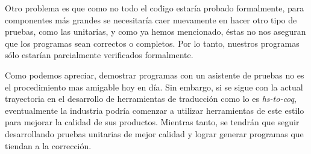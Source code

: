 Otro problema es que como no todo el co\'digo estaría probado formalmente, para componentes m\'as 
grandes se necesitaría caer nuevamente en hacer otro tipo de pruebas, como las unitarias, y como ya 
hemos mencionado, \'estas no nos aseguran que los programas sean correctos o completos. Por lo tanto, 
nuestros programas s\'olo estarían parcialmente verificados formalmente.

Como podemos apreciar, demostrar programas con un asistente de pruebas no es el procedimiento mas 
amigable hoy en día. Sin embargo, si se sigue con la actual trayectoria en el desarrollo de 
herramientas de traducci\'on como lo es \textit{hs-to-coq}, eventualmente la industria podría 
comenzar a utilizar herramientas de este estilo para mejorar la calidad de sus productos. Mientras 
tanto, se tendrán que seguir desarrollando pruebas unitarias de mejor calidad y lograr generar 
programas que tiendan a la correcci\'on.
